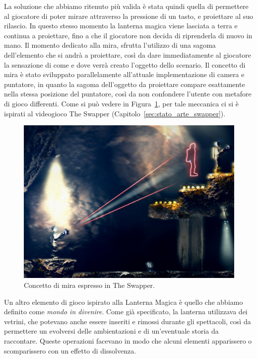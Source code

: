 La soluzione che abbiamo ritenuto più valida è stata quindi quella di permettere al giocatore di poter mirare attraverso la pressione di un tasto, e proiettare al suo rilascio. In questo stesso momento la lanterna magica viene lasciata a terra e continua a proiettare, fino a che il giocatore non decida di riprenderla di nuovo in mano.
Il momento dedicato alla mira, sfrutta l’utilizzo di una sagoma dell’elemento che si andrà a proiettare, così da dare immediatamente al giocatore la sensazione di come e dove verrà creato l’oggetto dello scenario.
Il concetto di mira è stato sviluppato parallelamente all’attuale implementazione di camera e puntatore, in quanto la sagoma dell’oggetto da proiettare compare esattamente nella stessa posizione del puntatore, così da non confondere l’utente con metafore di gioco differenti.
Come si può vedere in Figura~\ref{fig:meccaniche_precinema_swapper}, per tale meccanica ci si è ispirati al videogioco The Swapper (Capitolo~\ref{sec:stato_arte_swapper}).

\begin{figure}%
	\centering
	\includegraphics[width= 0.85\columnwidth]{images/gameDesign/21_swapper.jpg}
	\caption{Concetto di mira espresso in The Swapper.}
	\label{fig:meccaniche_precinema_swapper}
\end{figure} 

Un altro elemento di gioco ispirato alla Lanterna Magica è quello che abbiamo definito come \textit{mondo in divenire}.
Come già specificato, la lanterna utilizzava dei vetrini, che potevano anche essere inseriti e rimossi durante gli spettacoli, così da permettere un evolversi delle ambientazioni e di un’eventuale storia da raccontare. Queste operazioni facevano in modo che alcuni elementi apparissero o scomparissero con un effetto di dissolvenza.

